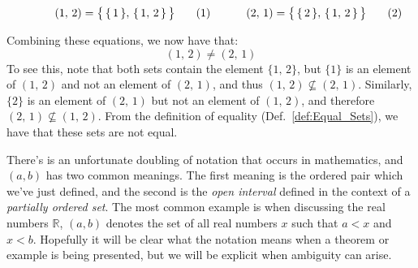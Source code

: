         \par
        \begin{subequations}
            \begin{minipage}[b]{0.49\textwidth}
                \begin{equation}
                    (1,\,2)=\big\{\,\{\,1\,\},\,\{\,1,\,2\,\}\,\big\}
                \end{equation}
            \end{minipage}
            \hfill
            \begin{minipage}[b]{0.49\textwidth}
                \begin{equation}
                    (2,\,1)=\big\{\,\{\,2\,\},\,\{\,1,\,2\,\}\,\big\}
                \end{equation}
            \end{minipage}
        \end{subequations}
        \par\vspace{2.5ex}
        Combining these equations, we now have that:
        \begin{equation}
            (1,\,2)\ne(2,\,1)
        \end{equation}
        To see this, note that both sets contain the element $\{1,\,2\}$, but
        $\{1\}$ is an element of $(1,\,2)$ and not an element of $(2,\,1)$,
        and thus $(1,\,2)\nsubseteq(2,\,1)$. Similarly, $\{2\}$ is an element
        of $(2,\,1)$ but not an element of $(1,\,2)$, and therefore
        $(2,\,1)\nsubseteq(1,\,2)$. From the definition of equality
        (Def.~\ref{def:Equal_Sets}), we have that these sets are not equal.
        \par\hfill\par
        There's is an unfortunate doubling of notation that occurs in
        mathematics, and $(a,b)$ has two common meanings. The first meaning is
        the ordered pair which we've just defined, and the second is the
        \textit{open interval} defined in the context of a
        \textit{partially ordered set}.
        The most common example is when discussing the real numbers
        $\mathbb{R}$, $(a,b)$ denotes the set of all real numbers $x$ such that
        $a<x$ and $x<b$. Hopefully it will be clear what the notation means when
        a theorem or example is being presented, but we will be explicit when
        ambiguity can arise.
        \par\hfill\par
